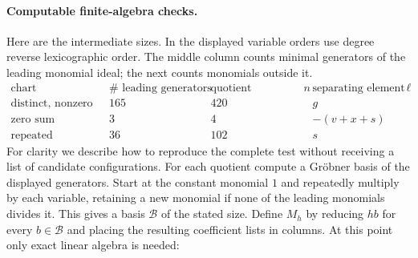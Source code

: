 \documentclass[11pt,letterpaper]{article}
\theoremstyle{definition}
\begin{document}
\paragraph{Computable finite-algebra checks.}
Here are the intermediate sizes. In the displayed variable orders
use degree reverse lexicographic order. The middle column counts
minimal generators of the leading monomial ideal; the next counts
monomials outside it.
\[
\begin{array}{l|r|r|l}
 \text{chart}&\#\text{ leading generators}&
 \text{quotient dimension }n&\text{separating element }\ell\\ \hline
 \text{distinct, nonzero sum}&165&420&g\\
 \text{zero sum}&3&4&-(v+x+s)\\
 \text{repeated}&36&102&s
\end{array}
\]
For clarity we describe how to reproduce the complete test without
receiving a list of candidate configurations. For each quotient
compute a Gr\"obner basis of the displayed generators. Start at the
constant monomial $1$ and repeatedly multiply by each variable,
retaining a new monomial if none of the leading monomials divides it.
This gives a basis $\mathcal B$ of the stated size. Define $M_h$
by reducing $h b$ for every $b\in\mathcal B$ and placing the
resulting coefficient lists in columns. At this point only exact
linear algebra is needed:
\end{document}
